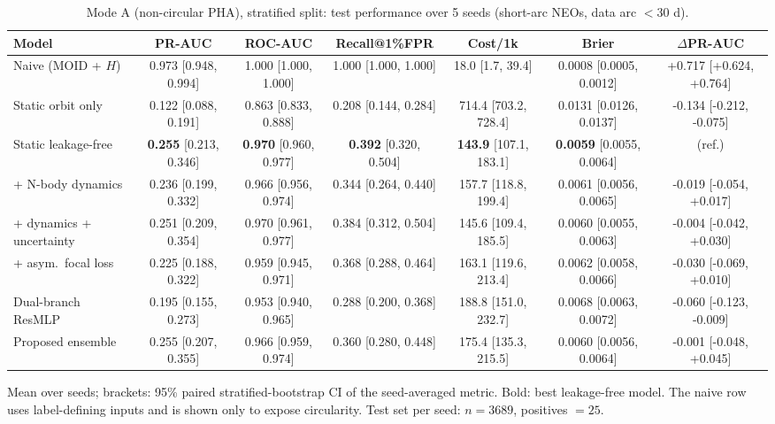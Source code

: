 \begin{table}[t]
\centering
\small
\caption{Mode A (non-circular PHA), stratified split: test performance over 5 seeds (short-arc NEOs, data arc $<30$ d).}
\label{tab:pha_stratified_short_arc}
\begin{tabular}{lcccccc}
\toprule
Model & PR-AUC & ROC-AUC & Recall@1\%FPR & Cost/1k & Brier & $\Delta$PR-AUC \\
\midrule
Naive (MOID + $H$) & 0.973 \scriptsize{[0.948, 0.994]} & 1.000 \scriptsize{[1.000, 1.000]} & 1.000 \scriptsize{[1.000, 1.000]} & 18.0 \scriptsize{[1.7, 39.4]} & 0.0008 \scriptsize{[0.0005, 0.0012]} & +0.717 \scriptsize{[+0.624, +0.764]} \\
\midrule
Static orbit only & 0.122 \scriptsize{[0.088, 0.191]} & 0.863 \scriptsize{[0.833, 0.888]} & 0.208 \scriptsize{[0.144, 0.284]} & 714.4 \scriptsize{[703.2, 728.4]} & 0.0131 \scriptsize{[0.0126, 0.0137]} & -0.134 \scriptsize{[-0.212, -0.075]} \\
Static leakage-free & \textbf{0.255} \scriptsize{[0.213, 0.346]} & \textbf{0.970} \scriptsize{[0.960, 0.977]} & \textbf{0.392} \scriptsize{[0.320, 0.504]} & \textbf{143.9} \scriptsize{[107.1, 183.1]} & \textbf{0.0059} \scriptsize{[0.0055, 0.0064]} & (ref.) \\
+ N-body dynamics & 0.236 \scriptsize{[0.199, 0.332]} & 0.966 \scriptsize{[0.956, 0.974]} & 0.344 \scriptsize{[0.264, 0.440]} & 157.7 \scriptsize{[118.8, 199.4]} & 0.0061 \scriptsize{[0.0056, 0.0065]} & -0.019 \scriptsize{[-0.054, +0.017]} \\
+ dynamics + uncertainty & 0.251 \scriptsize{[0.209, 0.354]} & 0.970 \scriptsize{[0.961, 0.977]} & 0.384 \scriptsize{[0.312, 0.504]} & 145.6 \scriptsize{[109.4, 185.5]} & 0.0060 \scriptsize{[0.0055, 0.0063]} & -0.004 \scriptsize{[-0.042, +0.030]} \\
+ asym.\ focal loss & 0.225 \scriptsize{[0.188, 0.322]} & 0.959 \scriptsize{[0.945, 0.971]} & 0.368 \scriptsize{[0.288, 0.464]} & 163.1 \scriptsize{[119.6, 213.4]} & 0.0062 \scriptsize{[0.0058, 0.0066]} & -0.030 \scriptsize{[-0.069, +0.010]} \\
Dual-branch ResMLP & 0.195 \scriptsize{[0.155, 0.273]} & 0.953 \scriptsize{[0.940, 0.965]} & 0.288 \scriptsize{[0.200, 0.368]} & 188.8 \scriptsize{[151.0, 232.7]} & 0.0068 \scriptsize{[0.0063, 0.0072]} & -0.060 \scriptsize{[-0.123, -0.009]} \\
Proposed ensemble & 0.255 \scriptsize{[0.207, 0.355]} & 0.966 \scriptsize{[0.959, 0.974]} & 0.360 \scriptsize{[0.280, 0.448]} & 175.4 \scriptsize{[135.3, 215.5]} & 0.0060 \scriptsize{[0.0056, 0.0064]} & -0.001 \scriptsize{[-0.048, +0.045]} \\
\bottomrule
\end{tabular}
\par\vspace{2pt}\footnotesize Mean over seeds; brackets: 95\% paired stratified-bootstrap CI of the seed-averaged metric. Bold: best leakage-free model. The naive row uses label-defining inputs and is shown only to expose circularity. Test set per seed: $n=3689$, positives $=25$.
\end{table}
